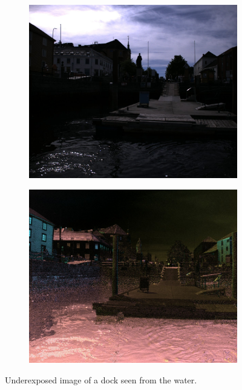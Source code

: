 \begin{figure}[H]
    \begin{subfigure}[T]{.49\textwidth}
        \includegraphics[width=\textwidth]{figures/pictures/img_10170_s0.jpg}
    \end{subfigure} \hfill
    \begin{subfigure}[T]{.49\textwidth}
        \includegraphics[width=\textwidth]{figures/pictures/img_10170_pol.jpg}
    \end{subfigure}
    \caption{Underexposed image of a dock seen from the water.}
\end{figure}
\vspace{-.5cm}


